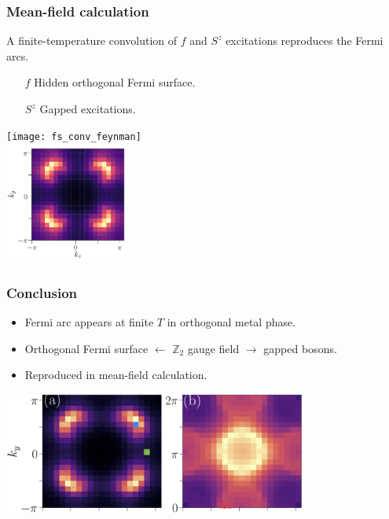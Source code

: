 \documentclass[xcolor=table, 10pt, aspectratio=1610]{beamer}
\begin{document}
\begin{frame}
  \frametitle{Mean-field calculation}
  A finite-temperature convolution of $f$ and $S^z$ excitations reproduces the Fermi arcs.
  \begin{itemize}
  \item[$f$] Hidden orthogonal Fermi surface.
  \item[$S^z$] Gapped excitations.
  \end{itemize}
  \begin{center}
    \texttt{[image: fs\_conv\_feynman]}\\
    \includegraphics[height=4cm]{arc_mf}
  \end{center}
\end{frame}

\begin{frame}
  \frametitle{Conclusion}
  \begin{itemize}
  \item Fermi arc appears at finite $T$ in orthogonal metal phase.
  \item Orthogonal Fermi surface $\leftarrow$ $\mathbb Z_2$ gauge field $\rightarrow$ gapped bosons.
  \item Reproduced in mean-field calculation.
  \end{itemize}
  \begin{center}
    \includegraphics[height=4cm]{fermi_arc}
  \end{center}
\end{frame}
\end{document}
